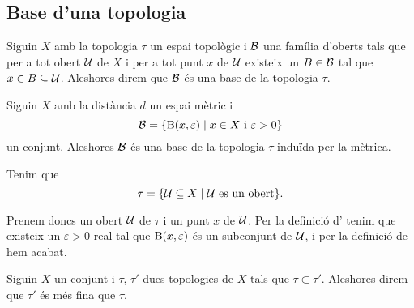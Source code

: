 \documentclass[../Apunts.tex]{subfiles}
\begin{document}
	\subsection{Base d'una topologia}
	\begin{definition}
		\label{def:base d'una topologia}
		Siguin \(X\) amb la topologia \(\tau\) un espai topològic i \(\mathcal{B}\) una família d'oberts tals que per a tot obert \(\mathcal{U}\) de \(X\) i per a tot punt \(x\) de \(\mathcal{U}\) existeix un \(B\in\mathcal{B}\) tal que \(x\in B\subseteq\mathcal{U}\). Aleshores direm que \(\mathcal{B}\) és una base de la topologia \(\tau\).
	\end{definition}
	\begin{example}
		Siguin \(X\) amb la distància \(d\) un espai mètric i
		\[\mathcal{B}=\{\operatorname{B}(x,\varepsilon)\mid x\in X\text{ i }\varepsilon>0\}\]
		un conjunt. Aleshores \(\mathcal{B}\) és una base de la topologia \(\tau\) induïda per la mètrica.
		\begin{solution}
			Tenim que
			\[\tau=\{\mathcal{U}\subseteq X\mid\mathcal{U}\text{ es un obert}\}.\]
			
			Prenem doncs un obert \(\mathcal{U}\) de \(\tau\) i un punt \(x\) de \(\mathcal{U}\). Per la definició d' tenim que existeix un \(\varepsilon>0\) real tal que \(\operatorname{B}(x,\varepsilon)\) és un subconjunt de \(\mathcal{U}\), i per la definició de  hem acabat.
		\end{solution}
	\end{example}
	\begin{definition}
		\label{def:finor d'una topologia}
		Siguin \(X\) un conjunt i \(\tau\), \(\tau'\) dues topologies de \(X\) tals que \(\tau\subset\tau'\). Aleshores direm que \(\tau'\) és més fina que \(\tau\).
	\end{definition}
%			
\end{document}

